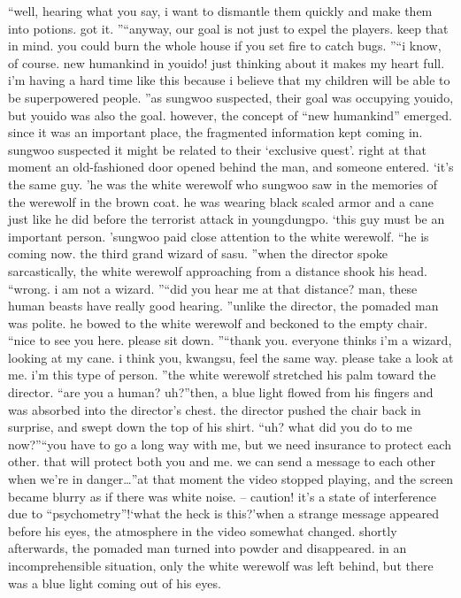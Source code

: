 “well, hearing what you say, i want to dismantle them quickly and make them into potions.
 got it.
”“anyway, our goal is not just to expel the players.
 keep that in mind.
 you could burn the whole house if you set fire to catch bugs.
”“i know, of course.
 new humankind in youido! just thinking about it makes my heart full.
 i’m having a hard time like this because i believe that my children will be able to be superpowered people.
”as sungwoo suspected, their goal was occupying youido, but youido was also the goal.
 however, the concept of “new humankind” emerged.
since it was an important place, the fragmented information kept coming in.
 sungwoo suspected it might be related to their ‘exclusive quest’.
right at that moment an old-fashioned door opened behind the man, and someone entered.
‘it’s the same guy.
’he was the white werewolf who sungwoo saw in the memories of the werewolf in the brown coat.
 he was wearing black scaled armor and a cane just like he did before the terrorist attack in youngdungpo.
‘this guy must be an important person.
’sungwoo paid close attention to the white werewolf.
“he is coming now.
 the third grand wizard of sasu.
”when the director spoke sarcastically, the white werewolf approaching from a distance shook his head.
“wrong.
 i am not a wizard.
”“did you hear me at that distance? man, these human beasts have really good hearing.
”unlike the director, the pomaded man was polite.
 he bowed to the white werewolf and beckoned to the empty chair.
“nice to see you here.
 please sit down.
”“thank you.
 everyone thinks i’m a wizard, looking at my cane.
 i think you, kwangsu, feel the same way.
 please take a look at me.
 i’m this type of person.
”the white werewolf stretched his palm toward the director.
“are you a human? uh?”then, a blue light flowed from his fingers and was absorbed into the director’s chest.
 the director pushed the chair back in surprise, and swept down the top of his shirt.
“uh? what did you do to me now?”“you have to go a long way with me, but we need insurance to protect each other.
 that will protect both you and me.
 we can send a message to each other when we’re in danger…”at that moment the video stopped playing, and the screen became blurry as if there was white noise.
– caution! it’s a state of interference due to “psychometry”!‘what the heck is this?’when a strange message appeared before his eyes, the atmosphere in the video somewhat changed.
shortly afterwards, the pomaded man turned into powder and disappeared.
 in an incomprehensible situation, only the white werewolf was left behind, but there was a blue light coming out of his eyes.


